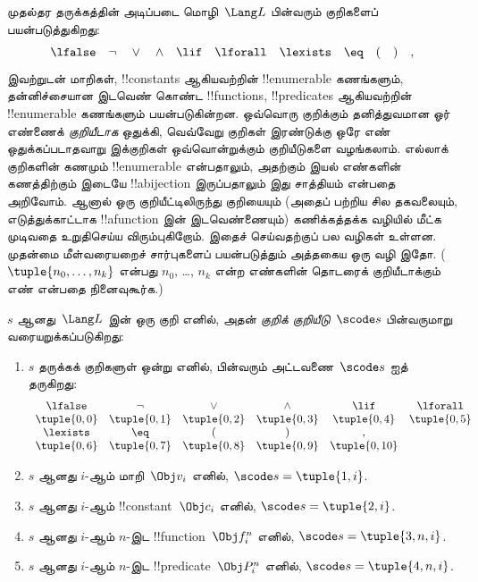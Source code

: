 \documentclass[../../../include/open-logic-section]{subfiles}
\begin{document}


முதல்தர தருக்கத்தின் அடிப்படை மொழி~$\Lang L$ பின்வரும் குறிகளைப்
பயன்படுத்துகிறது:
\[
\lfalse \quad \lnot \quad \lor \quad \land \quad \lif \quad \lforall
\quad \lexists \quad \eq \quad ( \quad ) \quad ,
\]
இவற்றுடன் மாறிகள், !!{constant}s ஆகியவற்றின் !!{enumerable} கணங்களும்,
தன்னிச்சையான இடவெண் கொண்ட !!{function}s, !!{predicate}s ஆகியவற்றின்
!!{enumerable} கணங்களும் பயன்படுகின்றன. ஒவ்வொரு குறிக்கும் தனித்துவமான
ஓர் எண்ணைக் \emph{குறியீடாக} ஒதுக்கி, வெவ்வேறு குறிகள் இரண்டுக்கு ஒரே
எண் ஒதுக்கப்படாதவாறு இக்குறிகள் ஒவ்வொன்றுக்கும் குறியீடுகளை வழங்கலாம்.
எல்லாக் குறிகளின் கணமும் !!{enumerable} என்பதாலும், அதற்கும் இயல் எண்களின்
கணத்திற்கும் இடையே !!a{bijection} இருப்பதாலும் இது சாத்தியம் என்பதை
அறிவோம். ஆனால் ஒரு குறியீட்டிலிருந்து குறியையும் (அதைப் பற்றிய சில தகவலையும்,
எடுத்துக்காட்டாக !!a{function} இன் இடவெண்ணையும்) கணிக்கத்தக்க வழியில்
மீட்க முடிவதை உறுதிசெய்ய விரும்புகிறோம். இதைச் செய்வதற்குப் பல வழிகள்
உள்ளன. முதன்மை மீள்வரையறைச் சார்புகளைப் பயன்படுத்தும் அத்தகைய ஒரு வழி
இதோ. ($\tuple{n_0, \dots, n_k}$ என்பது $n_0$, \dots, $n_k$ என்ற
எண்களின் தொடரைக் குறியீடாக்கும் எண் என்பதை நினைவுகூர்க.)

\begin{defn}
$s$ ஆனது~$\Lang L$ இன் ஒரு குறி எனில், அதன் \emph{குறிக்
குறியீடு}~$\scode s$ பின்வருமாறு வரையறுக்கப்படுகிறது:
\begin{enumerate}
\item $s$ தருக்கக் குறிகளுள் ஒன்று எனில், பின்வரும் அட்டவணை~$\scode s$
  ஐத் தருகிறது:
\[
\begin{array}{cccccccccc}
  \lfalse & \lnot & \lor & \land & \lif & \lforall \\
\tuple{0, 0} & \tuple{0, 1} & \tuple{0, 2} & \tuple{0, 3} &
\tuple{0, 4} & \tuple{0, 5} \\
\lexists & \eq & ( & ) & ,\\
\tuple{0, 6} & \tuple{0, 7} &
\tuple{0, 8} & \tuple{0, 9} & \tuple{0, 10}
\end{array}
\]
\item $s$ ஆனது $i$-ஆம் மாறி~$\Obj v_i$ எனில், $\scode s = \tuple{1, i}$.
\item $s$ ஆனது $i$-ஆம் !!{constant}~$\Obj c_i$ எனில்,
  $\scode s = \tuple{2, i}$.
\item $s$ ஆனது $i$-ஆம் $n$-இட !!{function}~$\Obj f_i^n$ எனில்,
  $\scode s = \tuple{3, n, i}$.
\item $s$ ஆனது $i$-ஆம் $n$-இட !!{predicate}~$\Obj P_i^n$ எனில்,
  $\scode s = \tuple{4, n, i}$.
\end{enumerate}
\end{defn}
\end{document}

